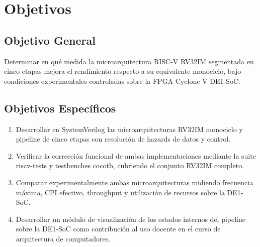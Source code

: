\section{Objetivos}
\label{sec:objetivos}

\subsection{Objetivo General}
Determinar en qué medida la microarquitectura RISC-V RV32IM segmentada en cinco etapas mejora el rendimiento respecto a su equivalente monociclo, bajo condiciones experimentales controladas sobre la FPGA Cyclone V DE1-SoC.

\subsection{Objetivos Específicos}
\begin{enumerate}

\item Desarrollar en SystemVerilog las microarquitecturas RV32IM monociclo y pipeline de cinco etapas con resolución de hazards de datos y control.

\item Verificar la corrección funcional de ambas implementaciones mediante la suite riscv-tests y testbenches cocotb, cubriendo el conjunto RV32IM completo.

\item Comparar experimentalmente ambas microarquitecturas midiendo frecuencia máxima, CPI efectivo, throughput y utilización de recursos sobre la DE1-SoC.

\item Desarrollar un módulo de visualización de los estados internos del pipeline sobre la DE1-SoC como contribución al uso docente en el curso de arquitectura de computadores.

\end{enumerate}
